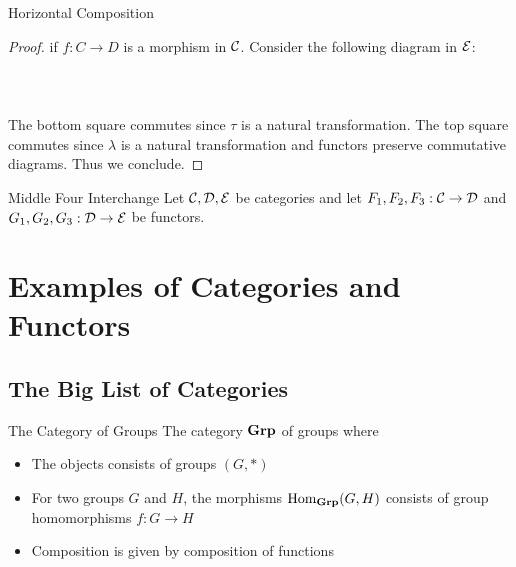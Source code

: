\documentclass[a4paper]{article}
\begin{document}
\begin{prp}{Horizontal Composition}{}
\begin{proof}
if $f:C\to D$ is a morphism in $\mathcal{C}$. Consider the following diagram in $\mathcal{E}$: \\~\\
\\~\\
The bottom square commutes since $\tau$ is a natural transformation. The top square commutes since $\lambda$ is a natural transformation and functors preserve commutative diagrams. Thus we conclude. 
\end{proof}
\end{prp}

\begin{prp}{Middle Four Interchange}{} Let $\mathcal{C},\mathcal{D},\mathcal{E}$ be categories and let $F_1,F_2,F_3:\mathcal{C}\to\mathcal{D}$ and $G_1,G_2,G_3:\mathcal{D}\to\mathcal{E}$ be functors. 
\end{prp}


\pagebreak
\section{Examples of Categories and Functors}
\subsection{The Big List of Categories}
\begin{defn}{The Category of Groups}{} The category $\bold{Grp}$ of groups where 
\begin{itemize}
\item The objects consists of groups $(G,\ast)$
\item For two groups $G$ and $H$, the morphisms $\operatorname{Hom}_\bold{Grp}(G,H)$ consists of group homomorphisms $f:G\to H$
\item Composition is given by composition of functions
\end{itemize}
\end{defn}
\end{document}

